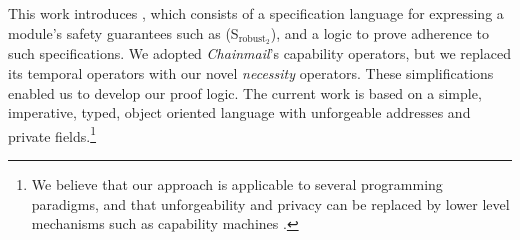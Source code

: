 \vspace{.04in}

This work introduces \Nec, which consists of a specification language for expressing a module's safety guarantees such as (S$_{\text{robust}_2}$), and a logic 
to prove adherence to such specifications.
We adopted %
\emph{Chainmail}'s %
  capability operators, 
but we replaced its temporal operators with  {our novel}
  \emph{necessity} operators. 
  These simplifications enabled us to develop our proof logic. 
The current work is based on a simple, imperative, typed, object oriented
language with unforgeable addresses and private fields.\footnote{We believe
 that our approach is applicable to several programming paradigms, and 
 that   unforgeability and privacy
 can be replaced 
 by lower level mechanisms such as capability machines \cite{vanproving,davis2019cheriabi}.
  }



 

